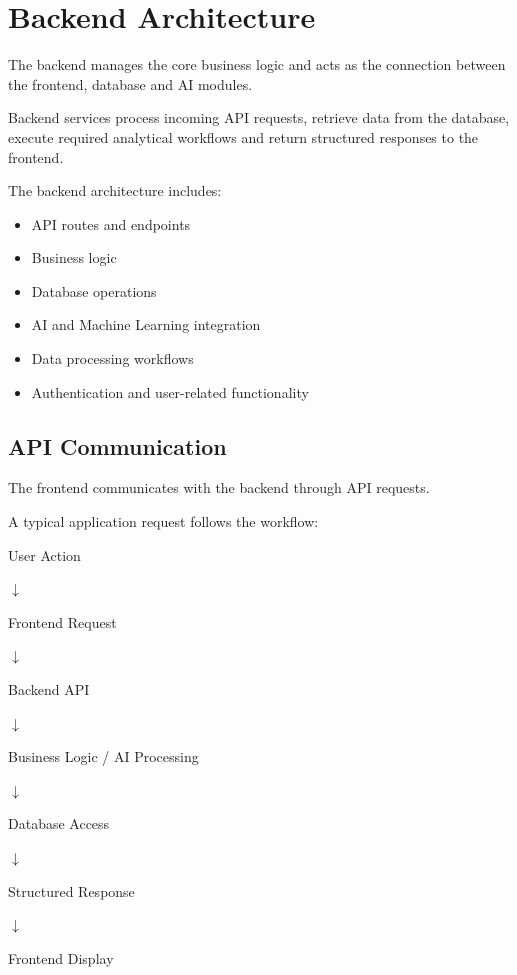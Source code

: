 \documentclass[12pt,a4paper]{report}
\begin{document}
\section{Backend Architecture}

The backend manages the core business logic and acts as the connection
between the frontend, database and AI modules.

Backend services process incoming API requests, retrieve data from the
database, execute required analytical workflows and return structured
responses to the frontend.

The backend architecture includes:

\begin{itemize}
    \item API routes and endpoints
    \item Business logic
    \item Database operations
    \item AI and Machine Learning integration
    \item Data processing workflows
    \item Authentication and user-related functionality
\end{itemize}


\subsection{API Communication}

The frontend communicates with the backend through API requests.

A typical application request follows the workflow:

\begin{center}

User Action

$\downarrow$

Frontend Request

$\downarrow$

Backend API

$\downarrow$

Business Logic / AI Processing

$\downarrow$

Database Access

$\downarrow$

Structured Response

$\downarrow$

Frontend Display

\end{center}
\end{document}

